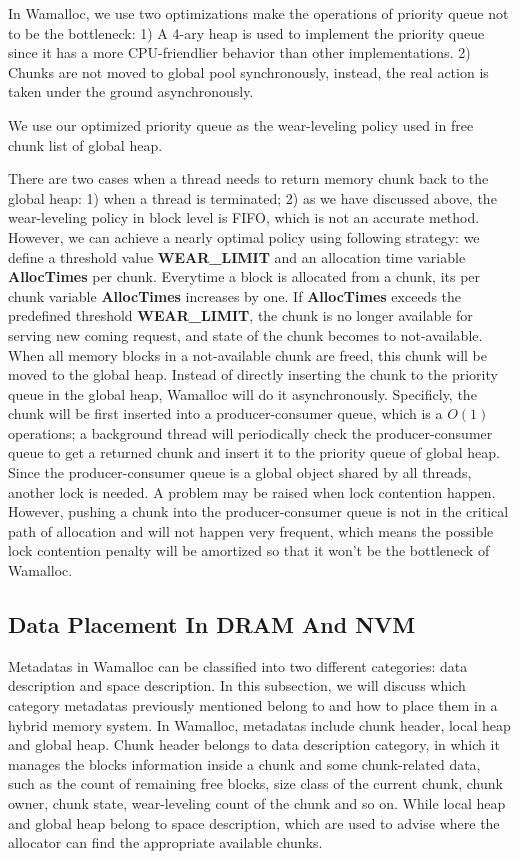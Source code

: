 \documentclass[10pt, conference, compsocconf]{IEEEtran}
\begin{document}
In Wamalloc, we use two optimizations make the operations of priority queue not to be the bottleneck:
1) A 4-ary heap is used to implement the priority queue since it has a more CPU-friendlier behavior than other implementations.
2) Chunks are not moved to global pool synchronously, instead, the real action is taken under the ground asynchronously.

We use our optimized priority queue as the wear-leveling policy used in free chunk list of global heap.

There are two cases when a thread needs to return memory chunk back to the global heap: 
1) when a thread is terminated;
2) as we have discussed above, the wear-leveling policy in block level is FIFO, which is not an accurate method.
However, we can achieve a nearly optimal policy using following strategy: 
we define a threshold value \textbf{WEAR\_LIMIT} and an allocation time variable \textbf{AllocTimes} per chunk. 
Everytime a block is allocated from a chunk, its per chunk variable \textbf{AllocTimes} increases by one.
If \textbf{AllocTimes} exceeds the predefined threshold \textbf{WEAR\_LIMIT}, 
the chunk is no longer available for serving new coming request, 
and state of the chunk becomes to not-available.
When all memory blocks in a not-available chunk are freed, 
this chunk will be moved to the global heap.
Instead of directly inserting the chunk to the priority queue in the global heap, Wamalloc will do it asynchronously.
Specificly, the chunk will be first inserted into a producer-consumer queue, which is a $O(1)$ operations;
a background thread will periodically check the producer-consumer queue to get a returned chunk 
and insert it to the priority queue of global heap.
Since the producer-consumer queue is a global object shared by all threads, another lock is needed.
A problem may be raised when lock contention happen.
However, pushing a chunk into the producer-consumer queue is not in the critical path of allocation and will not happen very frequent,
which means the possible lock contention penalty will be amortized so that it won't be the bottleneck of Wamalloc.

\subsection{Data Placement In DRAM And NVM}

Metadatas in Wamalloc can be classified into two different categories: data description and space description.
In this subsection, we will discuss which category metadatas previously mentioned belong to
and how to place them in a hybrid memory system.
In Wamalloc, metadatas include chunk header, local heap and global heap.
Chunk header belongs to data description category, 
in which it manages the blocks information inside a chunk and some chunk-related data, 
such as the count of remaining free blocks, size class of the current chunk,
chunk owner, chunk state, wear-leveling count of the chunk and so on.
While local heap and global heap belong to space description,
which are used to advise where the allocator can find the appropriate available chunks.
\end{document}
